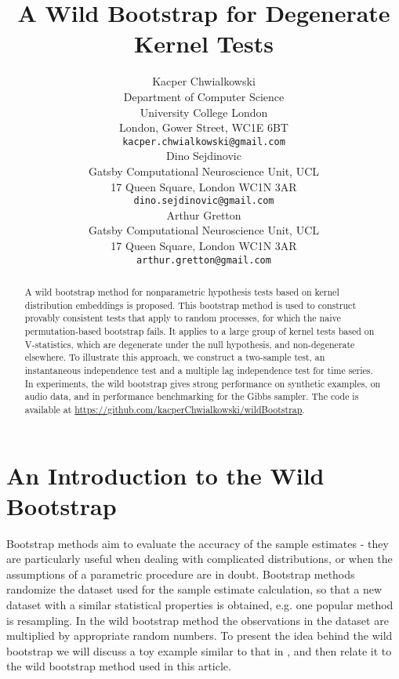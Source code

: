 \documentclass{article} %
\title{A Wild Bootstrap for Degenerate Kernel Tests}
\author{
Kacper Chwialkowski \\
Department of Computer Science\\
University College London\\
London, Gower Street, WC1E 6BT \\
\texttt{kacper.chwialkowski@gmail.com} \\
\And
Dino Sejdinovic \\
Gatsby Computational Neuroscience Unit, UCL \\
17 Queen Square, London WC1N 3AR \\
\texttt{dino.sejdinovic@gmail.com} \\
\AND
Arthur Gretton \\
Gatsby Computational Neuroscience Unit, UCL \\
17 Queen Square, London WC1N 3AR \\
\texttt{arthur.gretton@gmail.com} \\
}
\begin{document}
\maketitle

\begin{abstract}

A wild bootstrap method for nonparametric hypothesis tests based on kernel distribution embeddings is proposed. This
  bootstrap method is used to construct provably consistent tests that apply to random
  processes, for which the naive permutation-based bootstrap
  fails. It applies to a large group of kernel tests
  based on V-statistics, which are degenerate under the null
  hypothesis, and non-degenerate elsewhere. To illustrate this
  approach, we construct a two-sample test, an instantaneous independence
  test and a multiple lag independence test for time series.  In experiments, the wild
  bootstrap gives strong performance on synthetic examples, on audio
  data, and in performance benchmarking for the Gibbs sampler. The code is available at 
  \url{https://github.com/kacperChwialkowski/wildBootstrap}.    

\end{abstract}



\vspace{-4mm}




\vspace{-2mm}


\small



\newpage
\normalsize
\appendix




\section{An Introduction to the Wild Bootstrap}
\label{wildintro}
Bootstrap methods aim to evaluate the accuracy of the sample estimates - they are particularly useful when dealing with complicated distributions, or when the assumptions of a parametric procedure are in doubt. Bootstrap methods randomize the dataset used for the sample estimate calculation, so that a new dataset with a similar statistical properties is obtained, e.g. one popular method is resampling. In the wild bootstrap method  the observations in the dataset are multiplied by  appropriate random numbers. To present the idea behind the wild bootstrap we will discuss a toy example similar to that in \cite{Shao2010}, and then relate it to the wild bootstrap method used in this article. 
\end{document}

